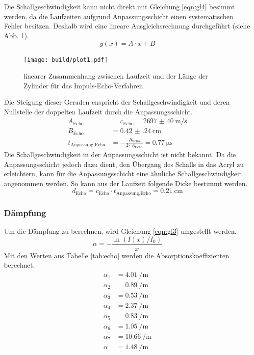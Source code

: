 Die Schallgeschwindigkeit kann nicht direkt mit Gleichung \eqref{eqn:gl4} besimmt werden, da die Laufzeiten aufgrund Anpassungsschicht einen systematischen Fehler besitzen.
Deshalb wird eine lineare Ausgleichsrechnung durchgeführt (siehe Abb. \ref{fig:plot1}).
\begin{equation}
  y(x) = A \cdot x + B
\end{equation}
\begin{figure}
  \texttt{[image: build/plot1.pdf]}
  \caption{linearer Zusammenhang zwischen Laufzeit und der Länge der Zylinder für das Impuls-Echo-Verfahren.}
  \label{fig:plot1}
\end{figure}
Die Steigung dieser Geraden enspricht der Schallgeschwindigkeit und deren Nullstelle der doppelten Laufzeit durch die Anpassungsschicht.
\begin{align*}
  A_\text{Echo} &= c_\text{Echo} = \SI{2697(40)}{\meter\per\second} \\
  B_\text{Echo} &= \SI{0.42(24)}{\centi\meter} \\
  t_\text{Anpassung,Echo} &= - \frac{B_\text{Echo}}{2 \cdot A_\text{Echo}} =\SI{0.77}{\micro\second}
\end{align*}
Die Schallgeschwindigkeit in der Anpassungsschicht ist nicht bekannt.
Da die Anpassungsschicht jedoch dazu dient, den Übergang des Schalls in das Acryl zu erleichtern, kann für die Anpassungsschicht eine ähnliche Schallgeschwindigkeit angenommen werden.
So kann aus der Laufzeit folgende Dicke bestimmt werden.
\begin{equation*}
d_\text{Echo} = c_\text{Echo} \cdot t_\text{Anpassung,Echo} = \SI{0.21}{\centi\meter}
\end{equation*}

\subsubsection{Dämpfung}

Um die Dämpfung zu berechnen, wird Gleichung \eqref{eqn:gl3} umgestellt werden.
\begin{equation}
 \alpha = -\frac{\ln(I(x)/I_0)}{x}
\end{equation}
Mit den Werten aus Tabelle \ref{tab:echo} werden die Absorptionskoeffizienten berechnet.
\begin{align*}
  \alpha_1 &= \SI{4.01}{\per\meter} \\
  \alpha_2 &= \SI{0.89}{\per\meter} \\
  \alpha_3 &= \SI{0.53}{\per\meter} \\
  \alpha_4 &= \SI{2.37}{\per\meter} \\
  \alpha_5 &= \SI{0.83}{\per\meter} \\
  \alpha_6 &= \SI{1.05}{\per\meter} \\
  \alpha_7 &= \SI{10.66}{\per\meter} \\
  \bar\alpha &= \SI{1.48}{\per\meter}
\end{align*}


